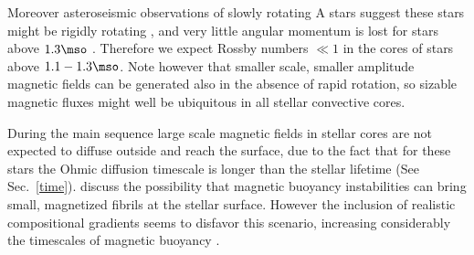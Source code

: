 Moreover asteroseismic observations of slowly rotating A stars suggest these stars might be rigidly rotating \cite{Kurtz_2014}, and very little angular momentum is lost for stars above $1.3\mso$ \citep[Kraft break, see e.g.]{1967ApJ...150..551K,2013ApJ...776...67V}. Therefore we expect Rossby numbers $\ll 1$ in the cores of stars above $1.1-1.3\mso$. Note however that smaller scale, smaller amplitude magnetic fields can be generated also in the absence of rapid rotation, so sizable magnetic fluxes might well be ubiquitous in all stellar convective cores. 

During the main sequence large scale magnetic fields in stellar cores are not expected to diffuse outside and reach the surface, due to the fact that for these stars the Ohmic diffusion timescale 
is longer than the stellar lifetime (See Sec.~\ref{time}). \citet{MacGregor_2003} discuss the possibility that magnetic buoyancy instabilities can bring small, magnetized fibrils at the stellar surface. However the inclusion of realistic compositional gradients seems to disfavor this scenario, increasing considerably the timescales of magnetic buoyancy \citep{MacDonald_2004}.  







  
 
  
  
  
  
  
  